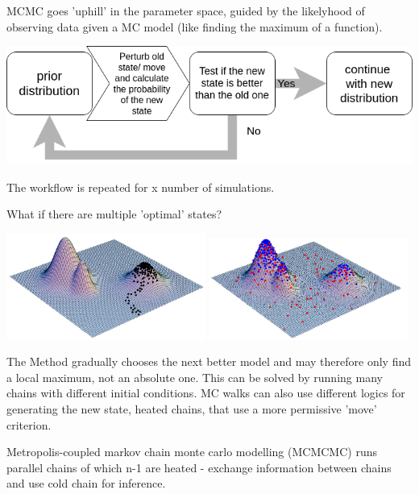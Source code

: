 \documentclass{article}
\begin{document}
MCMC goes 'uphill' in the parameter space, guided by the likelyhood of observing data given a MC model (like finding the maximum of a function).
\begin{center}
    \includegraphics[width = 1\textwidth]{bayesian/MCMC-flowchart.png}
\end{center}
The workflow is repeated for x number of simulations.\par 
What if there are multiple 'optimal' states?
\begin{center}
    \includegraphics[width = 0.49\textwidth]{bayesian/MCMC-graphic.png}
    \includegraphics[width = 0.49\textwidth]{bayesian/MCMC-figure-2.png}
\end{center}
The Method gradually chooses the next better model and may therefore only find a local maximum, not an absolute one. This can be solved by running many chains with different initial conditions. MC walks can also use different logics for generating the new state, heated chains, that use a more permissive 'move' criterion. \par 
Metropolis-coupled markov chain monte carlo modelling (MCMCMC) runs parallel chains of which n-1 are heated - exchange information between chains and use cold chain for inference.
\end{document}

